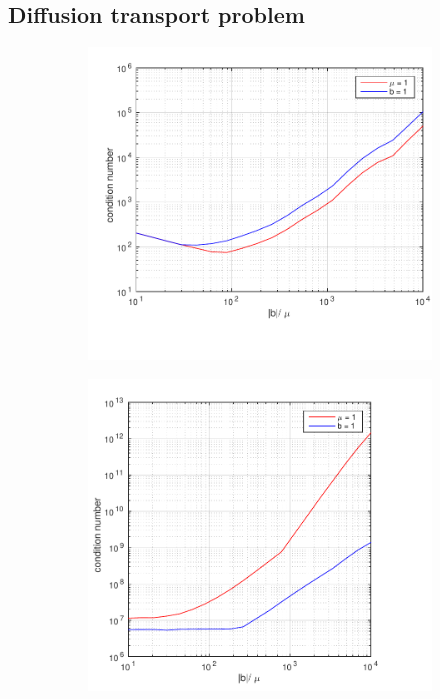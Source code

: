 \subsection{Diffusion transport problem}
%
\begin{figure}[b]
  \centering
  \begin{subfigure}[b]{0.48\textwidth}
		\includegraphics[width=\textwidth]{Figures/Spec_difftrans_ConditionNumber.pdf}
  \end{subfigure}%
  \quad
  \begin{subfigure}[b]{0.48\textwidth}
		\includegraphics[width=\textwidth]{Figures/Spec-LS_difftrans_ConditionNumber.pdf}

\end{subfigure}
\end{figure}

